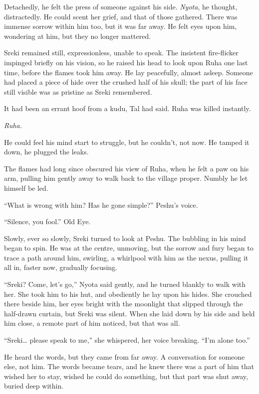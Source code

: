 Detachedly, he felt the press of someone against his side. \emph{Nyota}, he thought, distractedly. He could scent her grief, and that of those gathered. There was immense sorrow within him too, but it was far away. He felt eyes upon him, wondering at him, but they no longer mattered.

Sreki remained still, expressionless, unable to speak. The insistent fire-flicker impinged briefly on his vision, so he raised his head to look upon Ruha one last time, before the flames took him away. He lay peacefully, almost asleep. Someone had placed a piece of hide over the crushed half of his skull; the part of his face still visible was as pristine as Sreki remembered.

It had been an errant hoof from a kudu, Tal had said. Ruha was killed instantly.

\emph{Ruha.}

He could feel his mind start to struggle, but he couldn't, not now. He tamped it down, he plugged the leaks.

The flames had long since obscured his view of Ruha, when he felt a paw on his arm, pulling him gently away to walk back to the village proper. Numbly he let himself be led.

``What is wrong with him? Has he gone simple?'' Peshu's voice.

``Silence, you fool.'' Old Eye.

Slowly, ever so slowly, Sreki turned to look at Peshu. The bubbling in his mind began to spin. He was at the centre, unmoving, but the sorrow and fury began to trace a path around him, swirling, a whirlpool with him as the nexus, pulling it all in, faster now, gradually focusing.

``Sreki? Come, let's go,'' Nyota said gently, and he turned blankly to walk with her. She took him to his hut, and obediently he lay upon his hides. She crouched there beside him, her eyes bright with the moonlight that slipped through the half-drawn curtain, but Sreki was silent. When she laid down by his side and held him close, a remote part of him noticed, but that was all.

``Sreki\ldots{} please speak to me,'' she whispered, her voice breaking. ``I'm alone too.''

He heard the words, but they came from far away. A conversation for someone else, not him. The words became tears, and he knew there was a part of him that wished her to stay, wished he could do something, but that part was shut away, buried deep within.

